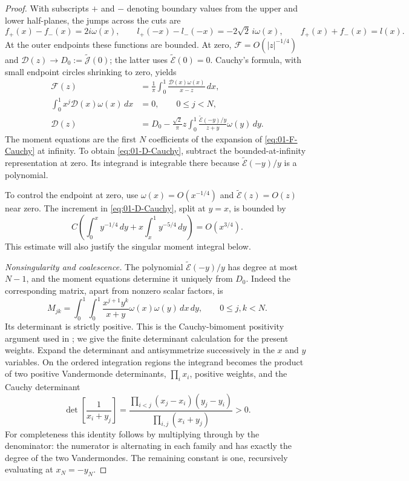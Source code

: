 \begin{proof}
With subscripts $+$ and $-$ denoting boundary values from the upper
and lower half-planes, the jumps across the cuts are
\[
 f_+(x)-f_-(x)=2i\omega(x),\qquad
 l_+(-x)-l_-(-x)=-2\sqrt2\,i\omega(x),\qquad
 f_+(x)+f_-(x)=l(x).
\]
At the outer endpoints these functions are bounded. At zero,
$\mathcal F=O(|z|^{-1/4})$ and
$\mathcal D(z)\to D_0:=\widetilde{\mathcal J}(0)$;
the latter uses $\widetilde{\mathcal E}(0)=0$. Cauchy's formula,
with small endpoint circles shrinking to zero, yields
\begin{align}
 \mathcal F(z)&=\frac1\pi\int_0^1
                   \frac{\mathcal D(x)\omega(x)}{x-z}\,dx,
        \label{eq:01-F-Cauchy}\\
 \int_0^1x^j\mathcal D(x)\omega(x)\,dx&=0,
                  \qquad 0\le j<N,
        \label{eq:01-moments}\\
 \mathcal D(z)&=D_0-\frac{\sqrt2}{\pi}z
       \int_0^1\frac{\widetilde{\mathcal E}(-y)/y}{z+y}
                    \omega(y)\,dy.
        \label{eq:01-D-Cauchy}
\end{align}
The moment equations are the first $N$ coefficients of the expansion
of \eqref{eq:01-F-Cauchy} at infinity. To obtain
\eqref{eq:01-D-Cauchy}, subtract the bounded-at-infinity representation
at zero. Its integrand is integrable there because
$\widetilde{\mathcal E}(-y)/y$ is a polynomial.

To control the endpoint at zero, use $\omega(x)=O(x^{-1/4})$ and
$\widetilde{\mathcal E}(z)=O(z)$ near zero. The increment in
\eqref{eq:01-D-Cauchy}, split at $y=x$, is bounded by
\[
 C\left(\int_0^x y^{-1/4}\,dy
       +x\int_x^1y^{-5/4}\,dy\right)=O(x^{3/4}).
\]
This estimate will also justify the singular moment integral below.

\smallskip\noindent\emph{Nonsingularity and coalescence.}
The polynomial $\widetilde{\mathcal E}(-y)/y$ has degree at most
$N-1$, and the moment equations determine it uniquely from $D_0$.
Indeed the corresponding matrix, apart from nonzero scalar factors,
is
\begin{equation}\label{eq:01-moment-matrix}
 M_{jk}=\int_0^1\int_0^1
           \frac{x^{j+1}y^k}{x+y}\omega(x)\omega(y)\,dx\,dy,
           \qquad 0\le j,k<N.
\end{equation}
Its determinant is strictly positive. This is the Cauchy-bimoment
positivity argument used in
\cite[Theorem~2.1]{BertolaGekhtmanSzmigielski2010}; we give the finite
determinant calculation for the present weights. Expand the determinant and
antisymmetrize successively in the $x$ and $y$ variables. On the
ordered integration regions the integrand becomes the product of
two positive Vandermonde determinants, $\prod_i x_i$, positive
weights, and the Cauchy determinant
\[
 \det\left[\frac1{x_i+y_j}\right]
 =\frac{\prod_{i<j}(x_j-x_i)(y_j-y_i)}{\prod_{i,j}(x_i+y_j)}>0.
\]
For completeness this identity follows by multiplying through by the
denominator: the numerator is alternating in each family and has
exactly the degree of the two Vandermondes. The remaining constant
is one, recursively evaluating at $x_N=-y_N$.


\end{proof}
